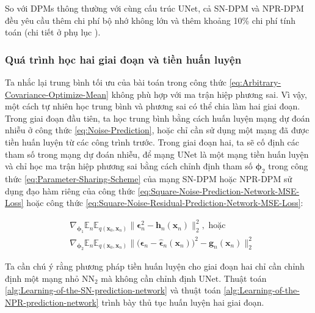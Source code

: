 \documentclass[14pt, a4paper]{article}
\numberwithin{equation}{section}
\numberwithin{figure}{section}
\numberwithin{dl}{section}
\numberwithin{md}{section}
\numberwithin{bd}{section}
\numberwithin{dn}{section}
\numberwithin{hq}{section}
\begin{document}
    So với DPMs thông thường với cùng cấu trúc $\mathrm{UNet}$, cả SN-DPM và NPR-DPM đều yêu cầu thêm chi phí bộ nhớ không lớn và thêm khoảng 10\% chi phí tính toán (chi tiết ở phụ lục ).

    \subsubsection{Quá trình học hai giai đoạn và tiền huấn luyện}

    Ta nhắc lại trung bình tối ưu của bài toán trong công thức \ref{eq:Arbitrary-Covariance-Optimize-Mean} không phù hợp với ma trận hiệp phương sai.
    Vì vậy, một cách tự nhiên học trung bình và phương sai có thể chia làm hai giai đoạn.
    Trong giai đoạn đầu tiên, ta học trung bình bằng cách huấn luyện mạng dự đoán nhiễu ở công thức \ref{eq:Noise-Prediction},
    hoặc chỉ cần sử dụng một mạng đã được tiền huấn luyện từ các công trình trước.
    Trong giai đoạn hai, ta sẽ cố định các tham số trong mạng dự đoán nhiễu, để mạng $\mathrm{UNet}$ là một mạng tiền huấn luyện và chỉ học ma trận hiệp phương sai bằng cách chỉnh định tham số $\boldsymbol{\phi}_2$ trong công thức \ref{eq:Parameter-Sharing-Scheme} của mạng SN-DPM hoặc NPR-DPM sử dụng đạo hàm riêng của công thức \ref{eq:Square-Noise-Prediction-Network-MSE-Loss} hoặc công thức \ref{eq:Square-Noise-Residual-Prediction-Network-MSE-Loss}:

    \begin{equation}
        \begin{aligned}
        &\nabla_{\boldsymbol{\phi}_1} \mathbb{E}_n \mathbb{E}_{q(\boldsymbol{x}_0, \boldsymbol{x}_n)} \lVert \boldsymbol{\epsilon}_n^2 - \boldsymbol{h}_n (\boldsymbol{x}_n) \rVert_2^2, \text{ hoặc} \\
        &\nabla_{\boldsymbol{\phi}_2} \mathbb{E}_n \mathbb{E}_{q(\boldsymbol{x}_0, \boldsymbol{x}_n)} \lVert \big( \boldsymbol{\epsilon}_n - \hat{\boldsymbol{\epsilon}}_n (\boldsymbol{x}_n) \big)^2 - \boldsymbol{g}_n (\boldsymbol{x}_n) \rVert_2^2
        \end{aligned}
    \end{equation}

    Ta cần chú ý rằng phương pháp tiền huấn luyện cho giai đoạn hai chỉ cần chỉnh định một mạng nhỏ $\mathrm{NN}_2$ mà không cần chỉnh định $\mathrm{UNet}$.
    Thuật toán \ref{alg:Learning-of-the-SN-prediction-network} và thuật toán \ref{alg:Learning-of-the-NPR-prediction-network} trình bày thủ tục huấn luyện hai giai đoạn.
    
\end{document}
